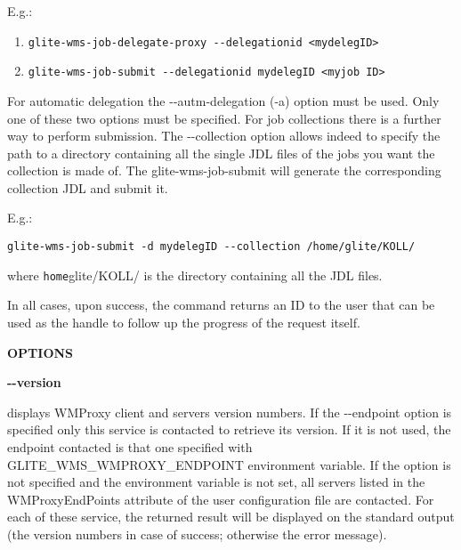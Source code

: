E.g.:


\begin{enumerate}


\item 
\begin{verbatim}
glite-wms-job-delegate-proxy --delegationid <mydelegID>
\end{verbatim}


\item 
\begin{verbatim}
glite-wms-job-submit --delegationid mydelegID <myjob ID>
\end{verbatim}

\end{enumerate}


For automatic delegation the -{}-autm-delegation (-a) option must be used. Only one of these two options must be specified. For job collections there is a further way to perform submission. The -{}-collection option allows indeed to specify the path to a directory containing all the single JDL files of the jobs you want the collection is made of.
The glite-wms-job-submit will generate the corresponding collection JDL and submit it. 


E.g.:

\begin{verbatim}
glite-wms-job-submit -d mydelegID --collection /home/glite/KOLL/
\end{verbatim}


where \verb /home/glite/KOLL/ {}  is the directory containing all the JDL files.

In all cases, upon success, the command returns an ID to the user that can be used as the handle to follow
up the progress of the request itself.



\medskip\textbf{OPTIONS}\smallskip



\textbf{-{}-version}

displays WMProxy client and servers version numbers.
If the -{}-endpoint option is specified only this service is contacted to retrieve its version. If it is not used, the endpoint contacted is that one specified with GLITE\_WMS\_WMPROXY\_ENDPOINT environment variable. If the option is not specified and the environment variable is not set, all servers listed in the WMProxyEndPoints attribute of the user configuration file are contacted. For each of these service, the returned result will be displayed on the standard output (the version numbers in case of success; otherwise the error message).





